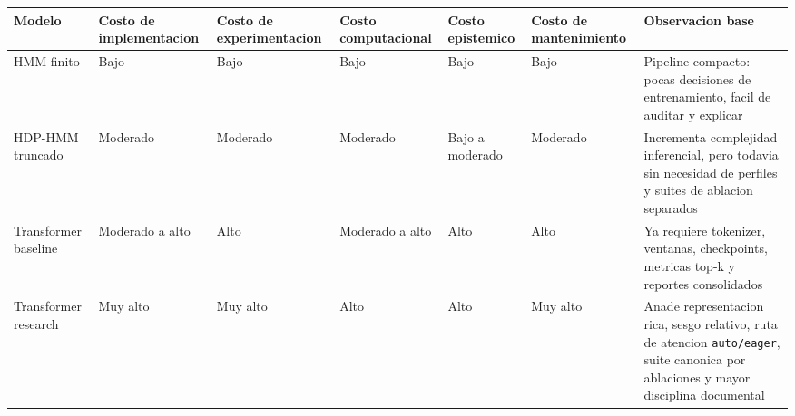 \begin{tabular}{p{3.0cm}p{2.2cm}p{2.3cm}p{2.2cm}p{2.1cm}p{2.1cm}p{2.9cm}}
\hline
Modelo & Costo de implementacion & Costo de experimentacion & Costo computacional & Costo epistemico & Costo de mantenimiento & Observacion base \\
\hline
HMM finito & Bajo & Bajo & Bajo & Bajo & Bajo & Pipeline compacto: pocas decisiones de entrenamiento, facil de auditar y explicar \\
HDP-HMM truncado & Moderado & Moderado & Moderado & Bajo a moderado & Moderado & Incrementa complejidad inferencial, pero todavia sin necesidad de perfiles y suites de ablacion separados \\
Transformer baseline & Moderado a alto & Alto & Moderado a alto & Alto & Alto & Ya requiere tokenizer, ventanas, checkpoints, metricas top-k y reportes consolidados \\
Transformer research & Muy alto & Muy alto & Alto & Alto & Muy alto & Anade representacion rica, sesgo relativo, ruta de atencion \texttt{auto/eager}, suite canonica por ablaciones y mayor disciplina documental \\
\hline
\end{tabular}
